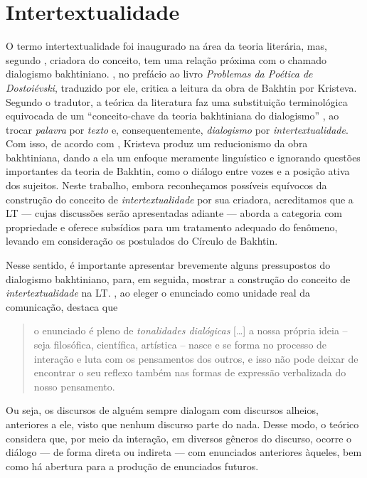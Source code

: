 \documentclass{textolivre}
\begin{document}
\section{Intertextualidade}\label{sec-conduta}
O termo intertextualidade foi inaugurado na área da teoria literária, mas, segundo \textcite{kristeva_introducao_2005}, criadora do conceito, tem uma relação próxima com o chamado dialogismo bakhtiniano. \textcite{bezerra_prefacio:_2018}, no prefácio ao livro \textit{Problemas da Poética de Dostoiévski}, traduzido por ele, critica a leitura da obra de Bakhtin por Kristeva. Segundo o tradutor, a teórica da literatura faz uma substituição terminológica equivocada de um “conceito-chave da teoria bakhtiniana do dialogismo” \cite[p. XIII]{bezerra_prefacio:_2018}, ao trocar \textit{palavra} por \textit{texto} e, consequentemente, \textit{dialogismo} por \textit{intertextualidade}. Com isso, de acordo com \textcite{bezerra_prefacio:_2018}, Kristeva produz um reducionismo da obra bakhtiniana, dando a ela um enfoque meramente linguístico e ignorando questões importantes da teoria de Bakhtin, como o diálogo entre vozes e a posição ativa dos sujeitos. Neste trabalho, embora reconheçamos possíveis equívocos da construção do conceito de \textit{intertextualidade} por sua criadora, acreditamos que a LT — cujas discussões serão apresentadas adiante — aborda a categoria com propriedade e oferece subsídios para um tratamento adequado do fenômeno, levando em consideração os postulados do Círculo de Bakhtin.

Nesse sentido, é importante apresentar brevemente alguns pressupostos do dialogismo bakhtiniano, para, em seguida, mostrar a construção do conceito de \textit{intertextualidade} na LT. \textcite[p. 298, grifos do autor]{bakhtin_os_2011}, ao eleger o enunciado como unidade real da comunicação, destaca que 

\begin{quote}
    o enunciado é pleno de \textit{tonalidades dialógicas} […] a nossa própria ideia – seja filosófica, científica, artística – nasce e se forma no processo de interação e luta com os pensamentos dos outros, e isso não pode deixar de encontrar o seu reflexo também nas formas de expressão verbalizada do nosso pensamento.
\end{quote}

Ou seja, os discursos de alguém sempre dialogam com discursos alheios, anteriores a ele, visto que nenhum discurso parte do nada. Desse modo, o teórico considera que, por meio da interação, em diversos gêneros do discurso, ocorre o diálogo — de forma direta ou indireta — com enunciados anteriores àqueles, bem como há abertura para a produção de enunciados futuros.
\end{document}
